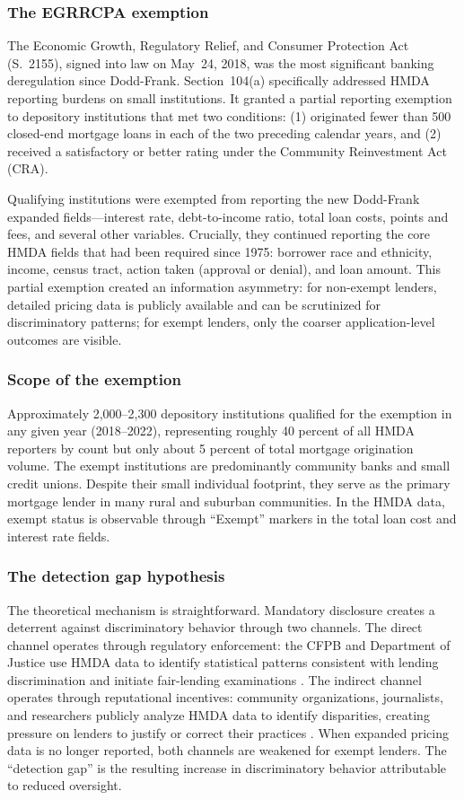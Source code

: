 \documentclass[12pt]{article}
\begin{document}
\subsubsection*{The EGRRCPA exemption} The Economic Growth, Regulatory Relief, and Consumer Protection Act (S.~2155), signed into law on May~24, 2018, was the most significant banking deregulation since Dodd-Frank. Section~104(a) specifically addressed HMDA reporting burdens on small institutions. It granted a partial reporting exemption to depository institutions that met two conditions: (1) originated fewer than 500 closed-end mortgage loans in each of the two preceding calendar years, and (2) received a satisfactory or better rating under the Community Reinvestment Act (CRA).

Qualifying institutions were exempted from reporting the new Dodd-Frank expanded fields---interest rate, debt-to-income ratio, total loan costs, points and fees, and several other variables. Crucially, they continued reporting the core HMDA fields that had been required since 1975: borrower race and ethnicity, income, census tract, action taken (approval or denial), and loan amount. This partial exemption created an information asymmetry: for non-exempt lenders, detailed pricing data is publicly available and can be scrutinized for discriminatory patterns; for exempt lenders, only the coarser application-level outcomes are visible.

\subsubsection*{Scope of the exemption} Approximately 2,000--2,300 depository institutions qualified for the exemption in any given year (2018--2022), representing roughly 40 percent of all HMDA reporters by count but only about 5 percent of total mortgage origination volume. The exempt institutions are predominantly community banks and small credit unions. Despite their small individual footprint, they serve as the primary mortgage lender in many rural and suburban communities. In the HMDA data, exempt status is observable through ``Exempt'' markers in the total loan cost and interest rate fields.

\subsubsection*{The detection gap hypothesis} The theoretical mechanism is straightforward. Mandatory disclosure creates a deterrent against discriminatory behavior through two channels. The direct channel operates through regulatory enforcement: the CFPB and Department of Justice use HMDA data to identify statistical patterns consistent with lending discrimination and initiate fair-lending examinations \citep{agarwal2014inconsistent}. The indirect channel operates through reputational incentives: community organizations, journalists, and researchers publicly analyze HMDA data to identify disparities, creating pressure on lenders to justify or correct their practices \citep{bhutta2015effects}. When expanded pricing data is no longer reported, both channels are weakened for exempt lenders. The ``detection gap'' is the resulting increase in discriminatory behavior attributable to reduced oversight.
\end{document}
